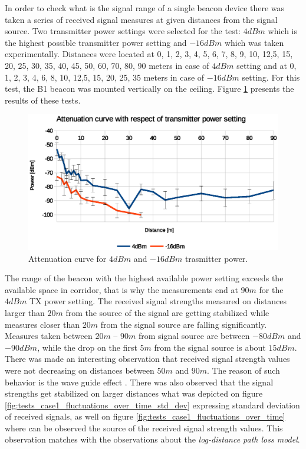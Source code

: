 \documentclass[../main.tex]{subfiles}
\begin{document}
In order to check what is the signal range of a single beacon device there was taken a series of received signal measures at given distances from the signal source. Two transmitter power settings were selected for the test: $4 dBm$ which is the highest possible transmitter power setting and $-16 dBm$ which was taken experimentally. Distances were located at 0, 1, 2, 3, 4, 5, 6, 7, 8, 9, 10, 12,5, 15, 20, 25, 30, 35, 40, 45, 50, 60, 70, 80, 90 meters in case of $4 dBm$ setting and at 0, 1, 2, 3, 4, 6, 8, 10, 12,5, 15, 20, 25, 35 meters in case of $-16 dBm$ setting. For this test, the B1 beacon was mounted vertically on the ceiling. Figure \ref{fig:tests_case1_attenuation} presents the results of these tests.

\begin{figure}[!htbp]
\includegraphics[width=\textwidth, keepaspectratio]{pictures/tests_case1_attenuation}
\centering
\caption{Attenuation curve for $4 dBm$ and $-16 dBm$ trasmitter power.}
\label{fig:tests_case1_attenuation}
\end{figure}

The range of the beacon with the highest available power setting exceeds the available space in corridor, that is why the measurements end at $90m$ for the $4dBm$ TX power setting. The received signal strengths measured on distances larger than $20m$ from the source of the signal are getting stabilized while measures closer than $20m$ from the signal source are falling significantly. Measures taken between $20m$ -- $90m$ from signal source are between $-80 dBm$ and $-90 dBm$, while the drop on the first $5m$ from the signal source is about $15 dBm$. There was made an interesting observation that received signal strength values were not decreasing on distances between $50m$ and $90m$. The reason of such behavior is the wave guide effect \cite{Thesis_CM}\cite{article_rf_propagation_practical_full}. There was also observed that the signal strengths get stabilized on larger distances what was depicted on figure \ref{fig:tests_case1_fluctuations_over_time_std_dev} expressing standard deviation of received signals, as well on figure \ref{fig:tests_case1_fluctuations_over_time} where can be observed the source of the received signal strength values. This observation matches with the observations about the \textit{log-distance path loss model}.
\end{document}
